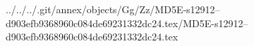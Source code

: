 ../../../.git/annex/objects/Gg/Zz/MD5E-s12912--d903efb9368960c084de69231332dc24.tex/MD5E-s12912--d903efb9368960c084de69231332dc24.tex